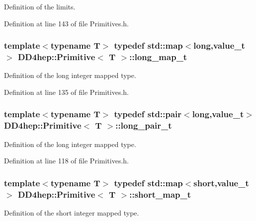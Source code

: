 Definition of the limits. 

Definition at line 143 of file Primitives.h.\hypertarget{struct_d_d4hep_1_1_primitive_ad93415660e6d4d711daa9d9135c6e2b5}{
\subsubsection[{long\_\-map\_\-t}]{\setlength{\rightskip}{0pt plus 5cm}template$<$typename T$>$ typedef std::map$<$long,{\bf value\_\-t}$>$ {\bf DD4hep::Primitive}$<$ {\bf T} $>$::{\bf long\_\-map\_\-t}}}
\label{struct_d_d4hep_1_1_primitive_ad93415660e6d4d711daa9d9135c6e2b5}


Definition of the long integer mapped type. 

Definition at line 135 of file Primitives.h.\hypertarget{struct_d_d4hep_1_1_primitive_a9430e72efcdbc036b1878b578f75c696}{
\subsubsection[{long\_\-pair\_\-t}]{\setlength{\rightskip}{0pt plus 5cm}template$<$typename T$>$ typedef std::pair$<$long,{\bf value\_\-t}$>$ {\bf DD4hep::Primitive}$<$ {\bf T} $>$::{\bf long\_\-pair\_\-t}}}
\label{struct_d_d4hep_1_1_primitive_a9430e72efcdbc036b1878b578f75c696}


Definition of the long integer mapped type. 

Definition at line 118 of file Primitives.h.\hypertarget{struct_d_d4hep_1_1_primitive_ad899cb08d4a2d808891f5297600653ae}{
\subsubsection[{short\_\-map\_\-t}]{\setlength{\rightskip}{0pt plus 5cm}template$<$typename T$>$ typedef std::map$<$short,{\bf value\_\-t}$>$ {\bf DD4hep::Primitive}$<$ {\bf T} $>$::{\bf short\_\-map\_\-t}}}
\label{struct_d_d4hep_1_1_primitive_ad899cb08d4a2d808891f5297600653ae}


Definition of the short integer mapped type. 

